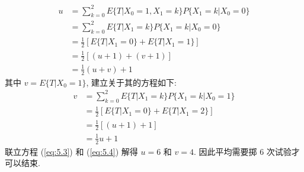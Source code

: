 \documentclass[boxes]{homework}
\begin{document}
\begin{solution}
\begin{equation}
\begin{aligned}
            u & = \sum_{k = 0}^2 E\{T \vert X_0 = 1, X_1 = k\} P\{X_1 = k \vert X_0 = 0\} \\
              & = \sum_{k = 0}^2 E\{T \vert X_1 = k\} P\{X_1 = k \vert X_0 = 0\}          \\
              & = \frac{1}{2} \left[E\{T\vert X_1 = 0\} + E\{T\vert X_1 = 1\}\right]      \\
              & = \frac{1}{2} \left[(u + 1) + (v + 1)\right]                              \\
              & = \frac{1}{2} \left(u + v\right) + 1
        \end{aligned}
    \end{equation}
    其中 $v = E\{T \vert X_0 = 1\}$, 建立关于其的方程如下:
    \begin{equation} \label{eq:5.4}
        \begin{aligned}
            v & =  \sum_{k = 0}^2 E\{T \vert X_1 = k\} P\{X_1 = k \vert X_0 = 1\}    \\
              & = \frac{1}{2} \left[E\{T\vert X_1 = 0\} + E\{T\vert X_1 = 2\}\right] \\
              & = \frac{1}{2} \left[(u + 1) + 1\right]                               \\
              & = \frac{1}{2} u + 1
        \end{aligned}
    \end{equation}
    联立方程 (\ref{eq:5.3}) 和 (\ref{eq:5.4}) 解得 $u = 6$ 和 $v = 4$. 因此平均需要掷 $6$ 次试验才可以结束.
\end{solution}
\end{document}
